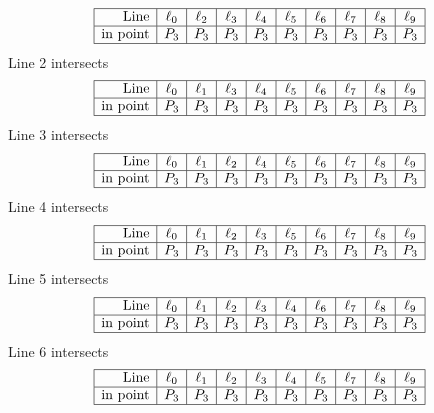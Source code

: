 \documentclass{article}
\begin{document}
{$$\begin{array}{|r*{9}{|c}|}
\hline
\mbox{Line}  & \ell_{0} & \ell_{2} & \ell_{3} & \ell_{4} & \ell_{5} & \ell_{6} & \ell_{7} & \ell_{8} & \ell_{9}\\
\hline
\mbox{in point}  & P_{3} & P_{3} & P_{3} & P_{3} & P_{3} & P_{3} & P_{3} & P_{3} & P_{3}\\
\hline
\end{array}
$$
Line 2 intersects 
$$
\begin{array}{|r*{9}{|c}|}
\hline
\mbox{Line}  & \ell_{0} & \ell_{1} & \ell_{3} & \ell_{4} & \ell_{5} & \ell_{6} & \ell_{7} & \ell_{8} & \ell_{9}\\
\hline
\mbox{in point}  & P_{3} & P_{3} & P_{3} & P_{3} & P_{3} & P_{3} & P_{3} & P_{3} & P_{3}\\
\hline
\end{array}
$$
Line 3 intersects 
$$
\begin{array}{|r*{9}{|c}|}
\hline
\mbox{Line}  & \ell_{0} & \ell_{1} & \ell_{2} & \ell_{4} & \ell_{5} & \ell_{6} & \ell_{7} & \ell_{8} & \ell_{9}\\
\hline
\mbox{in point}  & P_{3} & P_{3} & P_{3} & P_{3} & P_{3} & P_{3} & P_{3} & P_{3} & P_{3}\\
\hline
\end{array}
$$
Line 4 intersects 
$$
\begin{array}{|r*{9}{|c}|}
\hline
\mbox{Line}  & \ell_{0} & \ell_{1} & \ell_{2} & \ell_{3} & \ell_{5} & \ell_{6} & \ell_{7} & \ell_{8} & \ell_{9}\\
\hline
\mbox{in point}  & P_{3} & P_{3} & P_{3} & P_{3} & P_{3} & P_{3} & P_{3} & P_{3} & P_{3}\\
\hline
\end{array}
$$
Line 5 intersects 
$$
\begin{array}{|r*{9}{|c}|}
\hline
\mbox{Line}  & \ell_{0} & \ell_{1} & \ell_{2} & \ell_{3} & \ell_{4} & \ell_{6} & \ell_{7} & \ell_{8} & \ell_{9}\\
\hline
\mbox{in point}  & P_{3} & P_{3} & P_{3} & P_{3} & P_{3} & P_{3} & P_{3} & P_{3} & P_{3}\\
\hline
\end{array}
$$
Line 6 intersects 
$$
\begin{array}{|r*{9}{|c}|}
\hline
\mbox{Line}  & \ell_{0} & \ell_{1} & \ell_{2} & \ell_{3} & \ell_{4} & \ell_{5} & \ell_{7} & \ell_{8} & \ell_{9}\\
\hline
\mbox{in point}  & P_{3} & P_{3} & P_{3} & P_{3} & P_{3} & P_{3} & P_{3} & P_{3} & P_{3}\\
\hline
\end{array}
$$}
\end{document}
